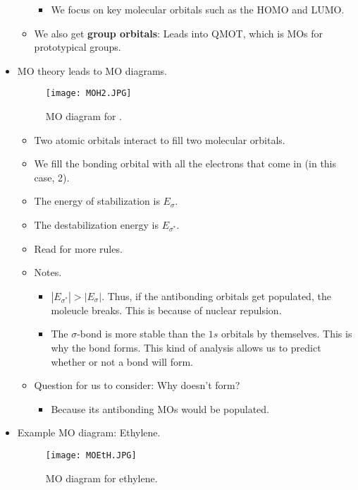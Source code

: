 \documentclass[../notes.tex]{subfiles}
\begin{document}
\begin{itemize}
\begin{itemize}
\begin{itemize}
            \item We focus on key molecular orbitals such as the HOMO and LUMO.
        \end{itemize}
        \item We also get \textbf{group orbitals}: Leads into QMOT, which is MOs for prototypical groups.
    \end{itemize}
    \item MO theory leads to MO diagrams.
    \begin{figure}[h!]
        \centering
        \texttt{[image: MOH2.JPG]}
        \caption{MO diagram for .}
        \label{fig:MOH2}
    \end{figure}
    \begin{itemize}
        \item Two atomic orbitals interact to fill two molecular orbitals.
        \item We fill the bonding orbital with all the electrons that come in (in this case, 2).
        \item The energy of stabilization is $E_{\sigma}$.
        \item The destabilization energy is $E_{\sigma^*}$.
        \item Read \textcite{bib:Anslyn} for more rules.
        \item Notes.
        \begin{itemize}
            \item $|E_{\sigma^*}|>|E_{\sigma}|$. Thus, if the antibonding orbitals get populated, the moleucle breaks. This is because of nuclear repulsion.
            \item The $\sigma$-bond is more stable than the $1s$ orbitals by themselves. This is why the  bond forms. This kind of analysis allows us to predict whether or not a bond will form.
        \end{itemize}
        \item Question for us to consider: Why doesn't  form?
        \begin{itemize}
            \item Because its antibonding MOs would be populated.
        \end{itemize}
    \end{itemize}
    \item Example MO diagram: Ethylene.
    \begin{figure}[H]
        \centering
        \texttt{[image: MOEtH.JPG]}
        \caption{MO diagram for ethylene.}

\end{figure}
\end{itemize}
\end{document}

